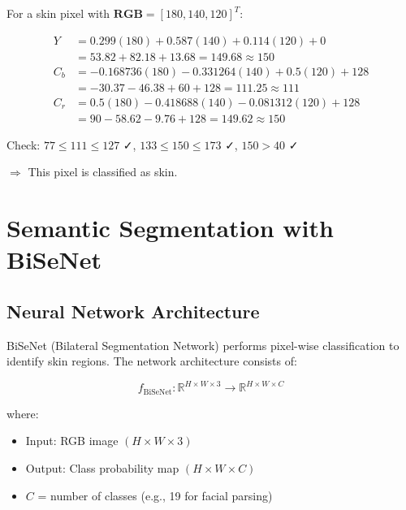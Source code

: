 \documentclass[11pt,a4paper]{article}
\newcommand{\vect}[1]{\bm{#1}}
\begin{document}
\begin{tcolorbox}[colback=blue!5!white,colframe=blue!75!black,title=Example: RGB to YCbCr Conversion]
For a skin pixel with $\vect{RGB} = [180, 140, 120]^T$:

\begin{align*}
Y &= 0.299(180) + 0.587(140) + 0.114(120) + 0 \\
  &= 53.82 + 82.18 + 13.68 = 149.68 \approx 150 \\
C_b &= -0.168736(180) - 0.331264(140) + 0.5(120) + 128 \\
    &= -30.37 - 46.38 + 60 + 128 = 111.25 \approx 111 \\
C_r &= 0.5(180) - 0.418688(140) - 0.081312(120) + 128 \\
    &= 90 - 58.62 - 9.76 + 128 = 149.62 \approx 150
\end{align*}

Check: $77 \leq 111 \leq 127$ ✓, $133 \leq 150 \leq 173$ ✓, $150 > 40$ ✓

$\Rightarrow$ This pixel is classified as skin.
\end{tcolorbox}

\section{Semantic Segmentation with BiSeNet}

\subsection{Neural Network Architecture}

BiSeNet (Bilateral Segmentation Network) performs pixel-wise classification to identify skin regions. The network architecture consists of:

\begin{equation}
f_{\text{BiSeNet}}: \mathbb{R}^{H \times W \times 3} \to \mathbb{R}^{H \times W \times C}
\end{equation}

where:
\begin{itemize}
    \item Input: RGB image $(H \times W \times 3)$
    \item Output: Class probability map $(H \times W \times C)$
    \item $C$ = number of classes (e.g., 19 for facial parsing)
\end{itemize}
\end{document}

